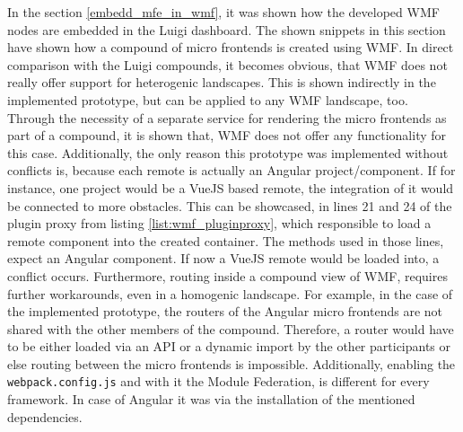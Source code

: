 In the section \ref{embedd_mfe_in_wmf}, it was shown how the developed WMF nodes are embedded in the Luigi dashboard. The shown snippets in this section have shown how a compound of micro frontends is created using WMF. In direct comparison with the Luigi compounds, it becomes obvious, that WMF does not really offer support for heterogenic landscapes. This is shown indirectly in the implemented prototype, but can be applied to any WMF landscape, too. 
Through the necessity of a separate service for rendering the micro frontends as part of a compound, it is shown that, WMF does not offer any functionality for this case. 
Additionally, the only reason this prototype was implemented without conflicts is, because each remote is actually an Angular project/component. If for instance, one project would be a VueJS based remote, the integration of it would be connected to more obstacles. This can be showcased, in lines 21 and 24 of the plugin proxy from listing \ref{list:wmf_pluginproxy}, which responsible to load a remote component into the created container. The methods used in those lines, expect an Angular component. If now a VueJS remote would be loaded into, a conflict occurs.
Furthermore, routing inside a compound view of WMF, requires further workarounds, even in a homogenic landscape. For example, in the case of the implemented prototype, the routers of the Angular micro frontends are not shared with the other members of the compound. Therefore, a router would have to be either loaded via an API or a dynamic import by the other participants or else routing between the micro frontends is impossible.
Additionally, enabling the \texttt{webpack.config.js} and with it the Module Federation, is different for every framework. In case of Angular it was via the installation of the mentioned dependencies.
